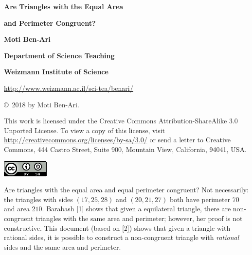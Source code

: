 \documentclass[11pt,a4paper]{article}
\begin{document}
\thispagestyle{empty}

\begin{center}

\textbf{\huge Are Triangles with the Equal Area}

\smallskip
\textbf{\huge and Perimeter Congruent?}

\bigskip
\bigskip
\bigskip

\textbf{\LARGE Moti Ben-Ari}

\bigskip

\textbf{\Large Department of Science Teaching}

\bigskip

\textbf{\Large Weizmann Institute of Science}

\bigskip

\url{http://www.weizmann.ac.il/sci-tea/benari/}

\end{center}

\bigskip
\bigskip

\begin{center}
\copyright{}\  2018 by Moti Ben-Ari.
\end{center}

This work is licensed under the Creative Commons Attribution-ShareAlike 3.0 Unported License. To view a copy of this license, visit \url{http://creativecommons.org/licenses/by-sa/3.0/} or send a letter to Creative Commons, 444 Castro Street, Suite 900, Mountain View, California, 94041, USA.

\bigskip

\begin{center}
\includegraphics[width=.2\textwidth]{../by-sa.png}
\end{center}

\newpage


Are triangles with the equal area and equal perimeter congruent? Not necessarily: the triangles with sides $(17,25,28)$ and $(20,21,27)$ both have perimeter $70$ and area $210$. Barabash [1] shows that given a equilateral triangle, there are non-congruent triangles with the same area and perimeter; however, her proof is not constructive. This document (based on [2]) shows that given a triangle with rational sides, it is possible to construct a non-congruent triangle with \emph{rational} sides and the same area and perimeter.
\end{document}
